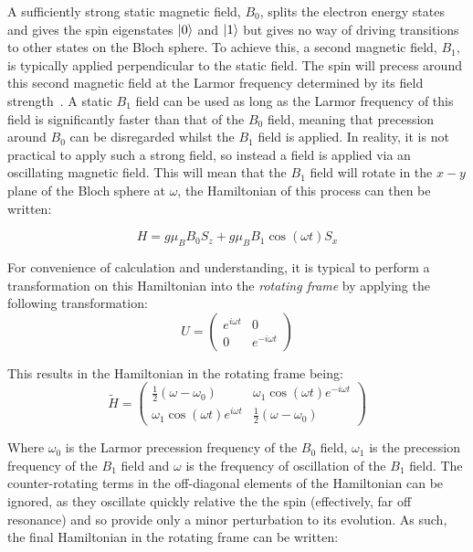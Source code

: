 A sufficiently strong static magnetic field, $B_0$, splits the electron energy states and gives the spin eigenstates $\ket{0}$ and $\ket{1}$ but gives no way of driving transitions to other states on the Bloch sphere. To achieve this, a second magnetic field, $B_1$, is typically applied perpendicular to the static field.  The spin will precess around this second magnetic field at the Larmor frequency determined by its field strength~\cite{Schweiger}. A static $B_1$ field can be used as long as the Larmor frequency of this field is significantly faster than that of the $B_0$ field, meaning that precession around $B_0$ can be disregarded whilst the $B_1$ field is applied. In reality, it is not practical to apply such a strong field, so instead a field is applied via an oscillating magnetic field. This will mean that the $B_1$ field will rotate in the $x-y$ plane of the Bloch sphere at $\omega$, the Hamiltonian of this process can then be written:

\begin{equation}
  H = g \mu_B B_0 S_z + g\mu_BB_1 \cos(\omega t)S_x
\end{equation}

For convenience of calculation and understanding, it is typical to perform a transformation on this Hamiltonian into the \emph{rotating frame} by applying the following transformation:
\begin{equation}
  U =
  \begin{pmatrix}
    e^{i \omega t} & 0 \\
    0 & e^{- i \omega t}
  \end{pmatrix}
\end{equation}

This results in the Hamiltonian in the rotating frame being:
\begin{equation}
  \tilde{H} =
  \begin{pmatrix}
    \frac{1}{2}(\omega - \omega_0) & \omega_1 \cos(\omega t) e^{-i \omega t} \\
    \omega_1 \cos(\omega t) e^{i \omega t} & \frac{1}{2}(\omega - \omega_0)
  \end{pmatrix}
\end{equation}

Where $\omega_0$ is the Larmor precession frequency of the $B_0$ field, $\omega_1$ is the precession frequency of the $B_1$ field and $\omega$ is the frequency of oscillation of the $B_1$ field. The counter-rotating terms in the off-diagonal elements of the Hamiltonian can be ignored, as they oscillate quickly relative the the spin (effectively, far off resonance) and so provide only a minor perturbation to its evolution. As such, the final Hamiltonian in the rotating frame can be written:

